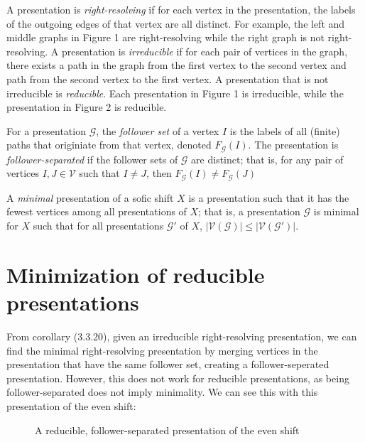 \documentclass{article}
\newcommand{\Gc}{\mathcal{G}}  %
\newcommand{\Vc}{\mathcal{V}}
\newcommand{\term}[1]{\textit{#1}}
\begin{document}
A presentation is \term{right-resolving} if for each vertex in the presentation, the 
labels of the outgoing edges of that vertex are all distinct. For example, the left and middle graphs 
in Figure 1 are right-resolving while the right graph is not right-resolving. A presentation  
is \term{irreducible} if for each pair of vertices in the graph, there exists a path in the graph 
from the first vertex to the second vertex and path from the second vertex to the first vertex.
A presentation that is not irreducible is \term{reducible}.
Each presentation in Figure 1 is irreducible, while the presentation in Figure 2 is reducible.

For a presentation \(\Gc\), the \term{follower set} of a vertex \(I\) is the labels of all 
(finite) paths that originiate from that vertex, denoted \(F_\Gc(I)\). The presentation is 
\term{follower-separated} if the follower sets of \(\Gc\) are distinct; that is,
for any pair of vertices \(I, J \in \Vc\) such that \(I \ne J\), then \(F_\Gc(I) \ne F_\Gc(J)\)

A \term{minimal} presentation of a sofic shift \(X\) is a presentation such that 
it has the fewest vertices among all presentations of \(X\); that is, 
a presentation \(\Gc\) is minimal for \(X\) such that for all 
presentations \(\Gc'\) of \(X\), \(|\Vc(\Gc)| \le |\Vc(\Gc')|\).

\section{Minimization of reducible presentations}


From \cite{lind1995introduction} corollary (3.3.20), given an irreducible right-resolving
presentation, we can find the minimal right-resolving presentation by merging 
vertices in the presentation that have the same follower set, creating a 
follower-seperated presentation. However, this does not work for reducible presentations, as 
being follower-separated does not imply minimality. We can see this with this presentation 
of the even shift:

\begin{figure}[h]
    \centering
    \caption{A reducible, follower-separated presentation of the even shift}
\end{figure}
\end{document}
